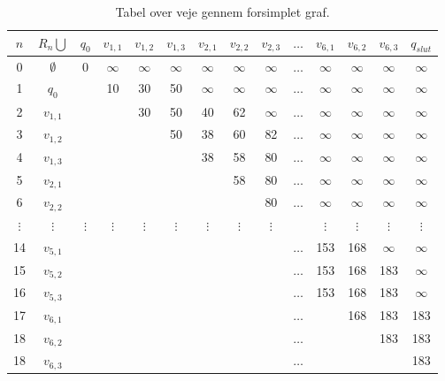 \begin{table}[H]
\centering
\begin{tabular}{|c|c|c|c|c|c|c|c|c|c|c|c|c|c|} 
\hline
$n$ & $R_{n} \bigcup$ & $q_{0}$ & $v_{1,1}$ & $v_{1,2}$ & $v_{1,3}$ & $v_{2,1}$ & $v_{2,2}$ & $v_{2,3}$ & $\ldots$ & $v_{6,1}$ & $v_{6,2}$ & $v_{6,3}$ & $q_{slut}$ \\
\hline
0 & $\emptyset$ & 0 & $\infty$ & $\infty$ & $\infty$ & $\infty$ & $\infty$ & $\infty$ & $\ldots$ & $\infty$ & $\infty$ & $\infty$ & $\infty$ \\ 
1 & $q_{0}$ & & 10 & 30 & 50 & $\infty$ & $\infty$ & $\infty$ & $\ldots$ & $\infty$ & $\infty$ & $\infty$ & $\infty$\\ 
2 & $v_{1,1}$ & & & 30 & 50 & 40 & 62 & $\infty$ & $\ldots$ & $\infty$ & $\infty$ & $\infty$ & $\infty$\\ 
3 & $v_{1,2}$ & & & & 50 & 38 & 60 & 82 & $\ldots$ & $\infty$ & $\infty$ & $\infty$ & $\infty$\\
4 & $v_{1,3}$ & & & & & 38 & 58 & 80 & $\ldots$ & $\infty$ & $\infty$ & $\infty$ & $\infty$\\ 
5 & $v_{2,1}$ & & & & & & 58 & 80 & $\ldots$ & $\infty$ & $\infty$ & $\infty$ & $\infty$\\ 
6 & $v_{2,2}$ & & & & & & & 80 & $\ldots$ & $\infty$ & $\infty$ & $\infty$ & $\infty$\\  
$\vdots$ & $\vdots$ & $\vdots$ & $\vdots$ & $\vdots$ & $\vdots$ & $\vdots$ & $\vdots$ & $\vdots$ &  & $\vdots$ & $\vdots$ & $\vdots$ & $\vdots$\\ 
14 & $v_{5,1}$ &  &  &  &  &  &  &  & $\ldots$ & 153 & 168 & $\infty$ & $\infty$\\ 
15 & $v_{5,2}$ &  &  &  &  &  &  &  & $\ldots$ & 153 & 168 & 183 & $\infty$\\ 
16 & $v_{5,3}$ &  &  &  &  &  &  &  & $\ldots$ & 153 & 168 & 183 & $\infty$\\ 
17 & $v_{6,1}$ &  &  &  &  &  &  &  & $\ldots$ &  & 168 & 183 & 183\\ 
18 & $v_{6,2}$ &  &  &  &  &  &  &  & $\ldots$ &  &  & 183 & 183\\ 
18 & $v_{6,3}$ &  &  &  &  &  &  &  & $\ldots$ &  &  &  & 183\\ 
\hline
\end{tabular}
\caption{Tabel over veje gennem forsimplet graf.}
\label{table:forsimplet_graf}
\end{table}
